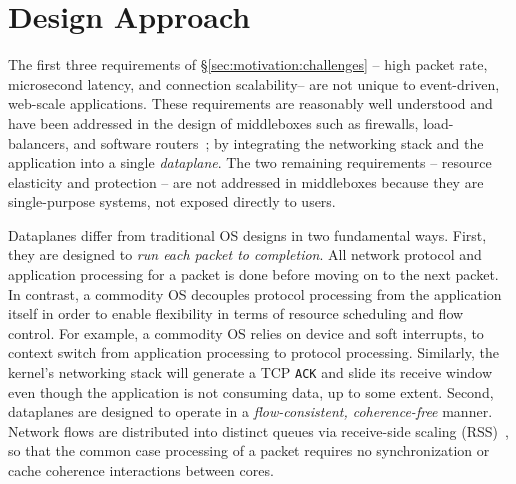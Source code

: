 \section{\ix Design Approach}
\label{sec:design}


The first three requirements of \S\ref{sec:motivation:challenges} --
high packet rate, microsecond latency, and connection scalability--
are not unique to event-driven, web-scale applications.  These
requirements are reasonably well understood and have been addressed in
the design of middleboxes such as firewalls,
load-balancers, and software
routers~\cite{DBLP:journals/tocs/KohlerMCJK00,DBLP:conf/sosp/DobrescuEACFIKMR09, missing-loadbalancers};
by integrating the networking stack and the application into a single
\emph{dataplane}. The two remaining requirements -- resource elasticity
and protection -- are not addressed in middleboxes because they
are single-purpose systems, not exposed directly to users.


Dataplanes differ from traditional OS designs in two fundamental
ways. First, they are designed to \emph{run each packet to
  completion}. All network protocol and application processing for a
packet is done before moving on to the next packet.  In contrast, a
commodity OS decouples protocol processing from the application itself
in order to enable flexibility in terms of resource scheduling and
flow control. For example, a commodity OS relies on device and soft
interrupts, to context switch from application processing to protocol
processing. Similarly, the kernel's networking stack will generate a
TCP \texttt{ACK} and slide its receive window even though the
application is not consuming data, up to some extent. Second,
dataplanes are designed to operate in a \emph{flow-consistent,
  coherence-free} manner.  Network flows are distributed into distinct
queues via receive-side scaling
(RSS)~\cite{DBLP:journals/computer/RegnierMIIMHNCF04}, so that the
common case processing of a packet requires no synchronization or
cache coherence interactions between cores.

